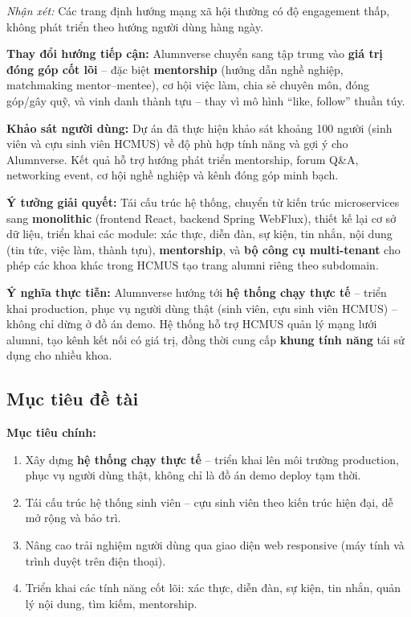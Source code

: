 \documentclass[12pt,a4paper]{article}
\begin{document}
\textit{Nhận xét:} Các trang định hướng mạng xã hội thường có độ engagement thấp, không phát triển theo hướng người dùng hàng ngày.

\textbf{Thay đổi hướng tiếp cận:} Alumnverse chuyển sang tập trung vào \textbf{giá trị đóng góp cốt lõi} -- đặc biệt \textbf{mentorship} (hướng dẫn nghề nghiệp, matchmaking mentor--mentee), cơ hội việc làm, chia sẻ chuyên môn, đóng góp/gây quỹ, và vinh danh thành tựu -- thay vì mô hình ``like, follow'' thuần túy.

\textbf{Khảo sát người dùng:} Dự án đã thực hiện khảo sát khoảng 100 người (sinh viên và cựu sinh viên HCMUS) về độ phù hợp tính năng và gợi ý cho Alumnverse. Kết quả hỗ trợ hướng phát triển mentorship, forum Q\&A, networking event, cơ hội nghề nghiệp và kênh đóng góp minh bạch.

\textbf{Ý tưởng giải quyết:} Tái cấu trúc hệ thống, chuyển từ kiến trúc microservices sang \textbf{monolithic} (frontend React, backend Spring WebFlux), thiết kế lại cơ sở dữ liệu, triển khai các module: xác thực, diễn đàn, sự kiện, tin nhắn, nội dung (tin tức, việc làm, thành tựu), \textbf{mentorship}, và \textbf{bộ công cụ multi-tenant} cho phép các khoa khác trong HCMUS tạo trang alumni riêng theo subdomain.

\textbf{Ý nghĩa thực tiễn:} Alumnverse hướng tới \textbf{hệ thống chạy thực tế} -- triển khai production, phục vụ người dùng thật (sinh viên, cựu sinh viên HCMUS) -- không chỉ dừng ở đồ án demo. Hệ thống hỗ trợ HCMUS quản lý mạng lưới alumni, tạo kênh kết nối có giá trị, đồng thời cung cấp \textbf{khung tính năng} tái sử dụng cho nhiều khoa.

\subsection{Mục tiêu đề tài}

\textbf{Mục tiêu chính:}

\begin{enumerate}
    \item Xây dựng \textbf{hệ thống chạy thực tế} -- triển khai lên môi trường production, phục vụ người dùng thật, không chỉ là đồ án demo deploy tạm thời.
    \item Tái cấu trúc hệ thống sinh viên -- cựu sinh viên theo kiến trúc hiện đại, dễ mở rộng và bảo trì.
    \item Nâng cao trải nghiệm người dùng qua giao diện web responsive (máy tính và trình duyệt trên điện thoại).
    \item Triển khai các tính năng cốt lõi: xác thực, diễn đàn, sự kiện, tin nhắn, quản lý nội dung, tìm kiếm, mentorship.
\end{enumerate}
\end{document}
